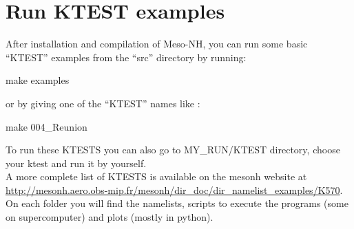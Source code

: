 \section{Run KTEST examples}
\label{sec:run_ktest_examples}

After installation and compilation of Meso-NH, you can run some basic ``KTEST'' examples from the ``src'' directory by running:
\begin{bashcode}
make examples 
\end{bashcode}

or by giving one of the ``KTEST'' names like :
\begin{bashcode}
make 004_Reunion
\end{bashcode}

To run these KTESTS you can also go to MY\_RUN/KTEST directory, choose your ktest and run it by yourself. \\

A more complete list of KTESTS is available on the mesonh website at \href{http://mesonh.aero.obs-mip.fr/mesonh/dir_doc/dir_namelist_examples/K570/}{http://mesonh.aero.obs-mip.fr/mesonh/dir\_doc/dir\_namelist\_examples/K570}.
On each folder you will find the namelists, scripts to execute the programs (some on supercomputer) and plots (mostly in python).

